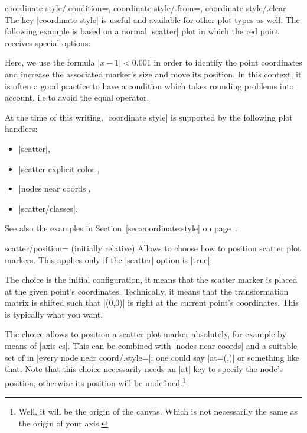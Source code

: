 {\begin{pgfplotskeylist}{%
    coordinate style/.condition=,
    coordinate style/.from=,
    coordinate style/.clear%
}
    The key |coordinate style| is useful and available for other plot types as
    well. The following example is based on a normal |scatter| plot in which
    the red point receives special options:
\begin{codeexample}[]
\end{codeexample}
    Here, we use the formula $\lvert x-1 \rvert < 0.001$ in order to identify
    the point coordinates and increase the associated marker's size and move
    its position. In this context, it is often a good practice to have a
    condition which takes rounding problems into account, i.e.\@ to avoid the
    equal operator.

    At the time of this writing, |coordinate style| is supported by the
    following plot handlers:
    \begin{itemize}
        \item |scatter|,
        \item |scatter explicit color|,
        \item |nodes near coords|,
        \item |scatter/classes|.
    \end{itemize}

    See also the examples in Section~\ref{sec:coordinate:style} on
    page~\pageref{sec:coordinate:style}.
\end{pgfplotskeylist}

\begin{pgfplotskey}{scatter/position= (initially relative)}
    Allows to choose how to position scatter plot markers. This applies only if
    the |scatter| option is |true|.

    The choice  is the initial configuration, it means
    that the scatter marker is placed at the given point's coordinates.
    Technically, it means that the transformation matrix is shifted such that
    |(0,0)| is right at the current point's coordinates. This is typically what
    you want.

    The choice  allows to position a scatter plot marker
    absolutely, for example by means of |axis cs|. This can be combined with
    |nodes near coords| and a suitable set of  in
    |every node near coord/.style=|: one could say
    |at={(\coordindex,)}| or something like that. Note that this
    choice necessarily needs an |at| key to specify the node's position,
    otherwise its position will be undefined.\footnote{Well, it will be the
    origin of the canvas. Which is not necessarily the same as the origin of
    your axis.}
\end{pgfplotskey}

}
